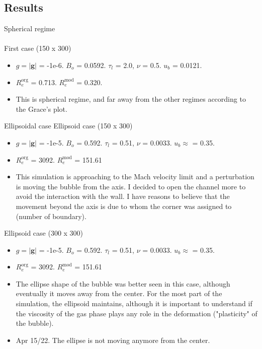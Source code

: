 \documentclass[8pt]{beamer}
\begin{document}
	\subsection*{Results}
	\begin{frame}[t]{Spherical regime}
		\textbf{}\\~\\
		
		First case (150 x 300)
		\begin{itemize}
			\item $g = \vert \mathbf{g}\vert $ = -1e-6. $B_o$ = 0.0592. $\tau_l$ = 2.0, $\nu$ = 0.5. $u_b$ = 0.0121. 
			\item $R_e^{\text{org}}$ = 0.713. $R_e^{\text{mod}}$ = 0.320. 
			
			\item This is spherical regime, and far away from the other regimes according to the Grace's plot. 
		
		\end{itemize}
		
	\end{frame}
	
	\begin{frame}[t]{Ellipsoidal case}
		Ellipsoid case (150 x 300)
		\begin{itemize}
			\item $g = \vert \mathbf{g}\vert $ = -1e-5. $B_o$ = 0.592. $\tau_l$ = 0.51, $\nu$ = 0.0033. $u_b \approx$ = 0.35. 
			\item $R_e^{\text{org}}$ = 3092. $R_e^{\text{mod}}$ = 151.61
			\item This simulation is approaching to the Mach velocity limit and a perturbation is moving the bubble from the axis. I decided to open the channel more to avoid the interaction with the wall. I have reasons to believe that the movement beyond the axis is due to whom the corner was assigned to (number of boundary).
		\end{itemize}
		Ellipsoid case (300 x 300)
		\begin{itemize}
			\item $g = \vert \mathbf{g}\vert $ = -1e-5. $B_o$ = 0.592. $\tau_l$ = 0.51, $\nu$ = 0.0033. $u_b \approx$ = 0.35. 
			\item $R_e^{\text{org}}$ = 3092. $R_e^{\text{mod}}$ = 151.61
			
			\item The ellipse shape of the bubble was better seen in this case, although eventually it moves away from the center. For the most part of the simulation, the ellipsoid maintains, although it is important to understand if the viscosity of the gas phase plays any role in the deformation ("plasticity" of the bubble).
			
			\item Apr 15/22. The ellipse is not moving anymore from the center. 
		\end{itemize}
	\end{frame}
\end{document}

